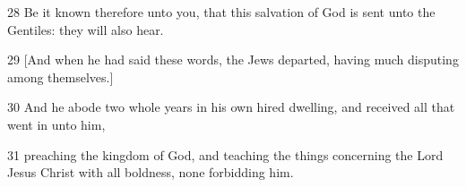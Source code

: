 \par 28 Be it known therefore unto you, that this salvation of God is sent unto the Gentiles: they will also hear.
\par 29 [And when he had said these words, the Jews departed, having much disputing among themselves.]
\par 30 And he abode two whole years in his own hired dwelling, and received all that went in unto him,
\par 31 preaching the kingdom of God, and teaching the things concerning the Lord Jesus Christ with all boldness, none forbidding him.

